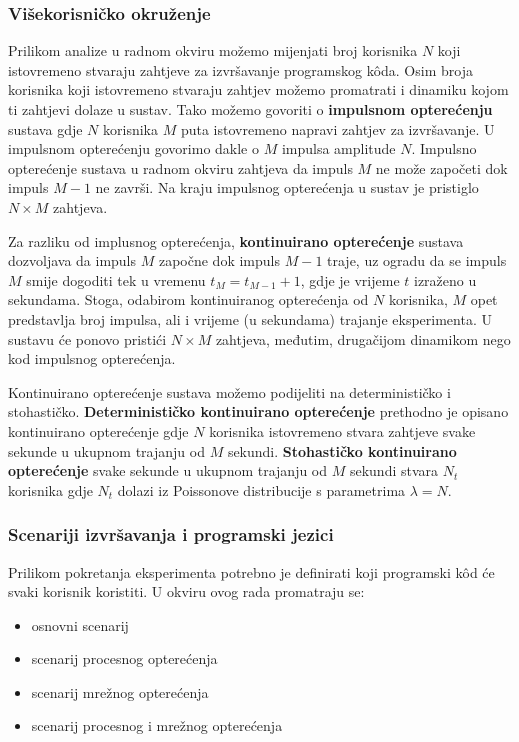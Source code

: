 \documentclass[times, utf8, diplomski]{fer}
\begin{document}
\subsubsection{Višekorisničko okruženje}
Prilikom analize u radnom okviru možemo mijenjati broj korisnika $N$ koji istovremeno stvaraju zahtjeve za izvršavanje programskog kôda. Osim broja korisnika koji istovremeno stvaraju zahtjev možemo promatrati i dinamiku kojom ti zahtjevi dolaze u sustav. Tako možemo govoriti o \textbf{impulsnom opterećenju} sustava gdje $N$ korisnika $M$ puta istovremeno napravi zahtjev za izvršavanje. U impulsnom opterećenju govorimo dakle o $M$ impulsa amplitude $N$. Impulsno opterećenje sustava u radnom okviru zahtjeva da impuls $M$ ne može započeti dok impuls $M-1$ ne završi. Na kraju impulsnog opterećenja u sustav je pristiglo $N \times M$ zahtjeva.

Za razliku od implusnog opterećenja, \textbf{kontinuirano opterećenje} sustava dozvoljava da impuls $M$ započne dok impuls $M-1$ traje, uz ogradu da se impuls $M$ smije dogoditi tek u vremenu $t_{M} = t_{M-1} + 1$, gdje je vrijeme $t$ izraženo u sekundama. Stoga, odabirom kontinuiranog opterećenja od $N$ korisnika, $M$ opet predstavlja broj impulsa, ali i vrijeme (u sekundama) trajanje eksperimenta. U sustavu će ponovo pristići $N \times M$ zahtjeva, međutim, drugačijom dinamikom nego kod impulsnog opterećenja.

Kontinuirano opterećenje sustava možemo podijeliti na determinističko i stohastičko. \textbf{Determinističko kontinuirano opterećenje} prethodno je opisano kontinuirano opterećenje gdje $N$ korisnika istovremeno stvara zahtjeve svake sekunde u ukupnom trajanju od $M$ sekundi. \textbf{Stohastičko kontinuirano opterećenje} svake sekunde u ukupnom trajanju od $M$ sekundi stvara $N_t$ korisnika gdje $N_t$ dolazi iz Poissonove distribucije s parametrima $\lambda = N$.

\subsubsection{Scenariji izvršavanja i programski jezici}
Prilikom pokretanja eksperimenta potrebno je definirati koji programski kôd će svaki korisnik koristiti. U okviru ovog rada promatraju se:
\begin{itemize}
    \item osnovni scenarij
    \item scenarij procesnog opterećenja
    \item scenarij mrežnog opterećenja
    \item scenarij procesnog i mrežnog opterećenja
\end{itemize}
\end{document}
